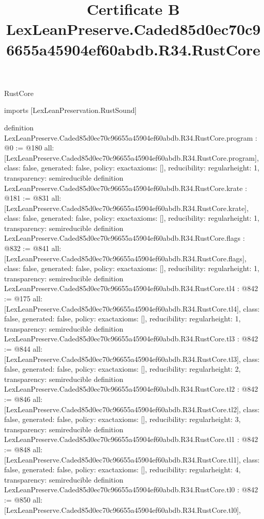 \begin{lexlean}{RustCore}
\title{Certificate B LexLeanPreserve.Caded85d0ec70c96655a45904ef60abdb.R34.RustCore}
\begin{coremodule}
imports [LexLeanPreservation.RustSound]

definition LexLeanPreserve.Caded85d0ec70c96655a45904ef60abdb.R34.RustCore.program : @0 := @180 {
  all: [LexLeanPreserve.Caded85d0ec70c96655a45904ef60abdb.R34.RustCore.program],
  class: false,
  generated: false,
  policy: exact{axioms: []},
  reducibility: regular{height: 1},
  transparency: semireducible
}
definition LexLeanPreserve.Caded85d0ec70c96655a45904ef60abdb.R34.RustCore.krate : @181 := @831 {
  all: [LexLeanPreserve.Caded85d0ec70c96655a45904ef60abdb.R34.RustCore.krate],
  class: false,
  generated: false,
  policy: exact{axioms: []},
  reducibility: regular{height: 1},
  transparency: semireducible
}
definition LexLeanPreserve.Caded85d0ec70c96655a45904ef60abdb.R34.RustCore.flags : @832 := @841 {
  all: [LexLeanPreserve.Caded85d0ec70c96655a45904ef60abdb.R34.RustCore.flags],
  class: false,
  generated: false,
  policy: exact{axioms: []},
  reducibility: regular{height: 1},
  transparency: semireducible
}
definition LexLeanPreserve.Caded85d0ec70c96655a45904ef60abdb.R34.RustCore.tl4 : @842 := @175 {
  all: [LexLeanPreserve.Caded85d0ec70c96655a45904ef60abdb.R34.RustCore.tl4],
  class: false,
  generated: false,
  policy: exact{axioms: []},
  reducibility: regular{height: 1},
  transparency: semireducible
}
definition LexLeanPreserve.Caded85d0ec70c96655a45904ef60abdb.R34.RustCore.tl3 : @842 := @844 {
  all: [LexLeanPreserve.Caded85d0ec70c96655a45904ef60abdb.R34.RustCore.tl3],
  class: false,
  generated: false,
  policy: exact{axioms: []},
  reducibility: regular{height: 2},
  transparency: semireducible
}
definition LexLeanPreserve.Caded85d0ec70c96655a45904ef60abdb.R34.RustCore.tl2 : @842 := @846 {
  all: [LexLeanPreserve.Caded85d0ec70c96655a45904ef60abdb.R34.RustCore.tl2],
  class: false,
  generated: false,
  policy: exact{axioms: []},
  reducibility: regular{height: 3},
  transparency: semireducible
}
definition LexLeanPreserve.Caded85d0ec70c96655a45904ef60abdb.R34.RustCore.tl1 : @842 := @848 {
  all: [LexLeanPreserve.Caded85d0ec70c96655a45904ef60abdb.R34.RustCore.tl1],
  class: false,
  generated: false,
  policy: exact{axioms: []},
  reducibility: regular{height: 4},
  transparency: semireducible
}
definition LexLeanPreserve.Caded85d0ec70c96655a45904ef60abdb.R34.RustCore.tl0 : @842 := @850 {
  all: [LexLeanPreserve.Caded85d0ec70c96655a45904ef60abdb.R34.RustCore.tl0],
}
\end{coremodule}
\end{lexlean}
